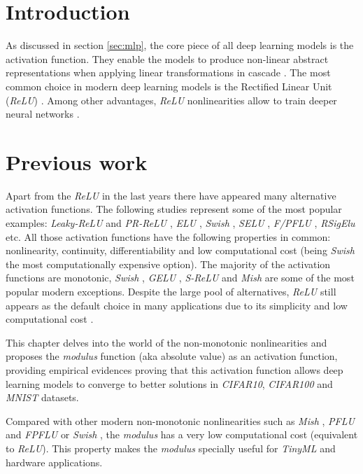 \section{Introduction}
As discussed in section \ref{sec:mlp}, the core piece of all deep learning models is the activation function. They enable the models to produce non-linear abstract representations when applying linear transformations in cascade \autocite{Goodfellow2016}. The most common choice in modern deep learning models is the Rectified Linear Unit (\textit{ReLU}) \autocite{nair2010}. Among other advantages, \textit{ReLU} nonlinearities allow to train deeper neural networks \autocite{xu2015}.

\section{Previous work}
Apart from the \textit{ReLU} in the last years there have appeared many alternative activation functions. The following studies represent some of the most popular examples: \textit{Leaky-ReLU} and \textit{PR-ReLU} \autocite{xu2015}, \textit{ELU} \autocite{djork2016}, \textit{Swish} \autocite{ramachandran2018}, \textit{SELU} \autocite{klambauer2017}, \textit{F/PFLU} \autocite{zhu2020}, \textit{RSigElu} \autocite{Kilicarslan2021} etc. All those activation functions have the following properties in common: nonlinearity, continuity, differentiability and low computational cost (being \textit{Swish} the most computationally expensive option). The majority of the activation functions are monotonic, \textit{Swish} \autocite{ramachandran2018}, \textit{GELU} \autocite{hendrycks2016},  \textit{S-ReLU} \autocite{Jin2016} and \textit{Mish} \autocite{misra2019mish} are some of the most popular modern exceptions. Despite the large pool of alternatives, \textit{ReLU} still appears as the default choice in many applications due to its simplicity and low computational cost \autocite{nair2010}.

This chapter delves into the world of the non-monotonic nonlinearities and proposes the \textit{modulus} function (aka absolute value) as an activation function, providing empirical evidences  proving that this activation function allows deep learning models to converge to better solutions in \textit{CIFAR10}, \textit{CIFAR100} and \textit{MNIST} datasets. 

Compared with other modern non-monotonic nonlinearities such as \textit{Mish} \autocite{misra2019mish}, \textit{PFLU} and \textit{FPFLU} \autocite{zhu2020} or \textit{Swish}  \autocite{ramachandran2018}, the \textit{modulus} has a very low computational cost (equivalent to \textit{ReLU}). This property makes the \textit{modulus} specially useful for \textit{TinyML} \autocite{sanchez2020} and hardware \autocite{Misra2010} applications.

